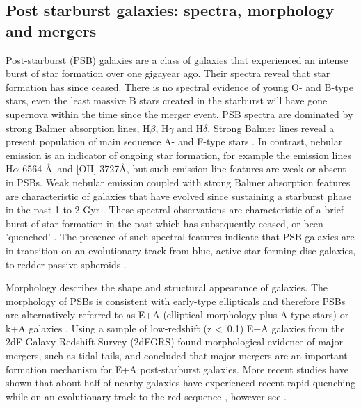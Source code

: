 \subsection{Post starburst galaxies: spectra, morphology and mergers}
\label{post-starburst-galaxies}
Post-starburst (PSB) galaxies are a class of galaxies that experienced an intense burst of star formation over one gigayear ago. Their spectra reveal that star formation has since ceased. There is no spectral evidence of young O- and B-type stars, even the least massive B stars created in the starburst will have gone supernova within the time since the merger event. PSB spectra are dominated by strong Balmer absorption lines, H$\beta$, H$\gamma$ and H$\delta$. Strong Balmer lines reveal a present population of main sequence A- and F-type stars \citep{1997A&A...325.1025P}. In contrast, nebular emission is an indicator of ongoing star formation, for example the emission lines H$\alpha$ 6564 \AA\ and [OII] 3727\AA, but such emission line features are weak or absent in PSBs. Weak nebular emission coupled with strong Balmer absorption features are characteristic of galaxies that have evolved since sustaining a starburst phase in the past 1 to 2 Gyr \citep{2001ApJ...547L..17B,2003PASJ...55..771G,2004MNRAS.355..713B,2005MNRAS.357..937G,2018MNRAS.477.1708P}. These spectral observations are characteristic of a brief burst of star formation in the past which has subsequently ceased, or been 'quenched' \citep{1983ApJ...270....7D,1987MNRAS.229..423C,1997A&A...325.1025P}. The presence of such spectral features indicate that PSB galaxies are in transition on an evolutionary track from blue, active star-forming disc galaxies, to redder passive spheroids \citep{2004MNRAS.355..713B,2012MNRAS.420..672S,2013MNRAS.429.2212M}. 

Morphology describes the shape and structural appearance of galaxies. The morphology of PSBs is consistent with early-type ellipticals and therefore PSBs are alternatively referred to as E+A (elliptical morphology plus A-type stars) or k+A galaxies \citep{1983ApJ...270....7D,1996ApJ...466..104Z,2009ARA&A..47..159B}. Using a sample of low-redshift (z \textless\ 0.1) E+A galaxies from the 2dF Galaxy Redshift Survey (2dFGRS) \citet{2004MNRAS.355..713B} found morphological evidence of major mergers, such as tidal tails, and concluded that major mergers are an important formation mechanism for E+A post-starburst galaxies. More recent studies have shown that about half of nearby galaxies have experienced recent rapid quenching while on an evolutionary track to the red sequence \citep{Martin_2007,10.1111/j.1365-2966.2009.14537.x,2015MNRAS.450..435S}, however see \cite{2017ApJ...845..145W}. 


